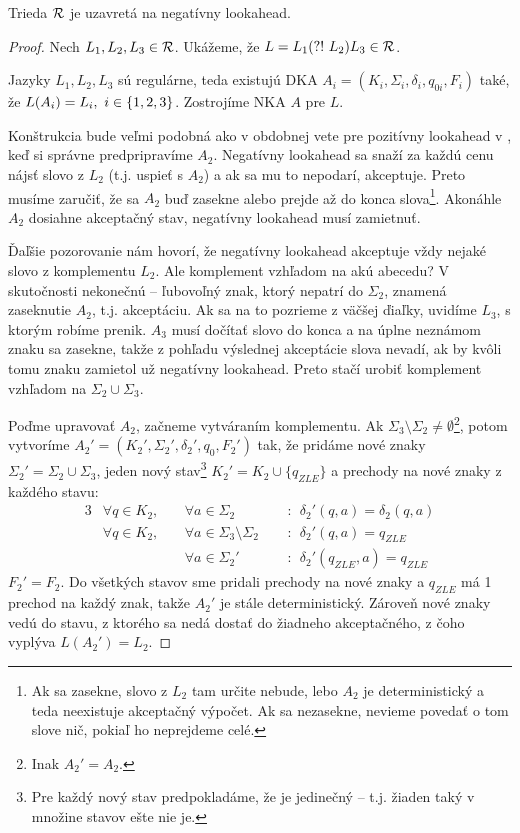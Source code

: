 \begin{lema}\label{nla+R}
Trieda ${\cal R}$ je uzavretá na negatívny lookahead.
\end{lema}
\begin{proof}
Nech $L_1,L_2,L_3 \in {\cal R}$. Ukážeme, že $L=L_1\text{(?!~} L_2)L_3 \in {\cal R}$.

Jazyky $ L_{1},L_{2},L_{3} $ sú regulárne, teda existujú DKA $ A_{i} = (K_{i},\Sigma_{i},\delta_{i},q_{0i},F_{i}) $ také, že $ L(A_{i})=\nobreak L_{i},\allowbreak~ i \in \lbrace 1,2,3\rbrace $. Zostrojíme NKA $A$ pre $L$.

Konštrukcia bude veľmi podobná ako v obdobnej vete pre pozitívny lookahead v \cite{mojaBak}, keď si správne predpripravíme $A_2$. Negatívny lookahead sa snaží za každú cenu nájsť slovo z $L_2$ (t.j. uspieť s $A_2$) a ak sa mu to nepodarí, akceptuje. Preto musíme zaručiť, že sa $A_2$ buď zasekne alebo prejde až do konca slova\footnote{Ak sa zasekne, slovo z $L_2$ tam určite nebude, lebo $A_2$ je deterministický a teda neexistuje akceptačný výpočet. Ak sa nezasekne, nevieme povedať o tom slove nič, pokiaľ ho neprejdeme celé.}. Akonáhle $A_2$ dosiahne akceptačný stav, negatívny lookahead musí zamietnuť. 

Ďaľšie pozorovanie nám hovorí, že negatívny lookahead akceptuje vždy nejaké slovo z komplementu $L_2$. Ale komplement vzhľadom na akú abecedu? V skutočnosti nekonečnú -- ľubovoľný znak, ktorý nepatrí do $\Sigma_2$, znamená zaseknutie $A_2$, t.j. akceptáciu. Ak sa na to pozrieme z väčšej ďiaľky, uvidíme $L_3$, s ktorým robíme prenik. $A_3$ musí dočítať slovo do konca a na úplne neznámom znaku sa zasekne, takže z pohľadu výslednej akceptácie slova nevadí, ak by kvôli tomu znaku zamietol už negatívny lookahead. Preto stačí urobiť komplement vzhľadom na $\Sigma_2 \cup \Sigma_3$. 

Poďme upravovať $A_2$, začneme vytváraním komplementu. Ak $\Sigma_3 \setminus \Sigma_2 \neq\emptyset$\footnote{Inak $A_2'=A_2$.}, potom vytvoríme $A_2'= (K_2',\Sigma_2',\delta_2',q_{0},F_2')$ tak, že pridáme nové znaky $\Sigma_2'=\Sigma_2 \cup \Sigma_3$,  jeden nový stav\footnote{Pre každý nový stav predpokladáme, že je jedinečný -- t.j. žiaden taký v množine stavov ešte nie je.} $K_2'=K_2 \cup \lbrace q_{ZLE} \rbrace$ a prechody na nové znaky z každého stavu: 
\begin{alignat*}{3}
& \forall q \in K_2, &&~ \forall a \in \Sigma_2 &&~~:~~  \delta_2'(q,a)=\delta_2(q,a) \\
& \forall q \in K_2, &&~ \forall a \in \Sigma_3 \setminus \Sigma_2 &&~~:~~ \delta_2'(q,a)=q_{ZLE} \\
&~&&~ \forall a \in \Sigma_2' &&~~:~~  \delta_2'(q_{ZLE},a)=q_{ZLE}
\end{alignat*}
 $F_2'=F_2.$ Do všetkých stavov sme pridali prechody na nové znaky a $q_{ZLE}$ má 1 prechod na každý znak, takže $A_2'$ je stále deterministický. Zároveň nové znaky vedú do stavu, z ktorého sa nedá dostať do žiadneho akceptačného, z čoho vyplýva $L(A_2')=L_2$.


\end{proof}
